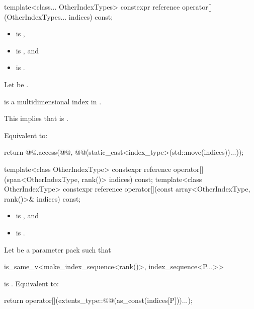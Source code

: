 %
\begin{itemdecl}
template<class... OtherIndexTypes>
  constexpr reference operator[](OtherIndexTypes... indices) const;
\end{itemdecl}

\begin{itemdescr}
\pnum
\constraints
\begin{itemize}
\item
{} is ,
\item
{} is , and
\item
{} is .
\end{itemize}

\pnum
Let  be .

\pnum
\hardexpects
{} is a multidimensional index in .
\begin{note}
This implies that
is .
\end{note}

\pnum
\effects
Equivalent to:
\begin{codeblock}
return @@.access(@@, @@(static_cast<index_type>(std::move(indices))...));
\end{codeblock}
\end{itemdescr}

%
\begin{itemdecl}
template<class OtherIndexType>
  constexpr reference operator[](span<OtherIndexType, rank()> indices) const;
template<class OtherIndexType>
  constexpr reference operator[](const array<OtherIndexType, rank()>& indices) const;
\end{itemdecl}

\begin{itemdescr}
\pnum
\constraints
\begin{itemize}
\item
{} is , and
\item
{} is .
\end{itemize}

\pnum
\effects
Let  be a parameter pack such that
\begin{codeblock}
is_same_v<make_index_sequence<rank()>, index_sequence<P...>>
\end{codeblock}
is .
Equivalent to:
\begin{codeblock}
return operator[](extents_type::@@(as_const(indices[P]))...);
\end{codeblock}
\end{itemdescr}

